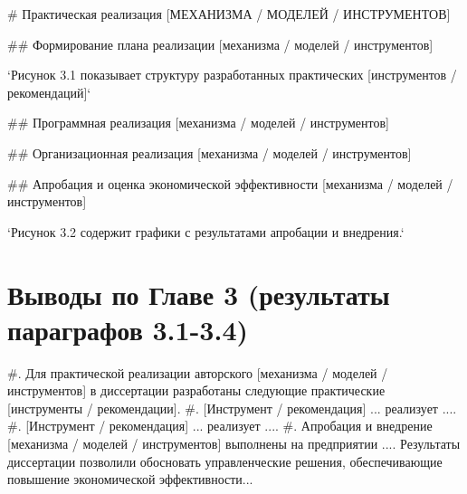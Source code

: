 # Практическая реализация [МЕХАНИЗМА / МОДЕЛЕЙ / ИНСТРУМЕНТОВ]\label{ch:ch3}

## Формирование плана реализации [механизма / моделей / инструментов]\label{sec:ch3/sect1}

`Рисунок 3.1 показывает структуру разработанных практических [инструментов / рекомендаций]`

## Программная реализация [механизма / моделей / инструментов]\label{sec:ch3/sect2}


## Организационная реализация [механизма / моделей / инструментов]\label{sec:ch3/sect3}


## Апробация и оценка экономической эффективности [механизма / моделей / инструментов]\label{sec:ch3/sect4}


`Рисунок 3.2 содержит графики с результатами апробации и внедрения.`

\section*{Выводы по Главе 3 (результаты параграфов 3.1-3.4)}

#. Для практической реализации авторского [механизма / моделей / инструментов] в диссертации разработаны следующие практические [инструменты / рекомендации].
#. [Инструмент / рекомендация] ... реализует ....
#. [Инструмент / рекомендация] ... реализует ....
#. Апробация и внедрение [механизма / моделей / инструментов] выполнены на предприятии .... Результаты диссертации позволили обосновать управленческие решения, обеспечивающие повышение экономической эффективности...

\FloatBarrier
\clearpage